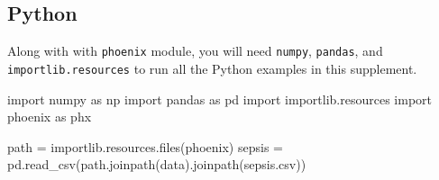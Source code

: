\documentclass[
  letterpaper,
  DIV=11,
  numbers=noendperiod]{scrartcl}
\newenvironment{Shaded}{\begin{snugshade}}{\end{snugshade}}
\newcommand{\ImportTok}[1]{\textcolor[rgb]{0.00,0.46,0.62}{#1}}
\newcommand{\NormalTok}[1]{\textcolor[rgb]{0.00,0.23,0.31}{#1}}
\newcommand{\OperatorTok}[1]{\textcolor[rgb]{0.37,0.37,0.37}{#1}}
\newcommand{\StringTok}[1]{\textcolor[rgb]{0.13,0.47,0.30}{#1}}
\begin{document}
\subsection{Python}\label{python-1}

Along with with \texttt{phoenix} module, you will need \texttt{numpy},
\texttt{pandas}, and \texttt{importlib.resources} to run all the Python
examples in this supplement.

\begin{Shaded}
\begin{Highlighting}[]
\ImportTok{import}\NormalTok{ numpy }\ImportTok{as}\NormalTok{ np}
\ImportTok{import}\NormalTok{ pandas }\ImportTok{as}\NormalTok{ pd}
\ImportTok{import}\NormalTok{ importlib.resources}
\ImportTok{import}\NormalTok{ phoenix }\ImportTok{as}\NormalTok{ phx}

\NormalTok{path }\OperatorTok{=}\NormalTok{ importlib.resources.files(}\StringTok{\textquotesingle{}phoenix\textquotesingle{}}\NormalTok{)}
\NormalTok{sepsis }\OperatorTok{=}\NormalTok{ pd.read\_csv(path.joinpath(}\StringTok{\textquotesingle{}data\textquotesingle{}}\NormalTok{).joinpath(}\StringTok{\textquotesingle{}sepsis.csv\textquotesingle{}}\NormalTok{))}


\end{Highlighting}
\end{Shaded}
\end{document}
